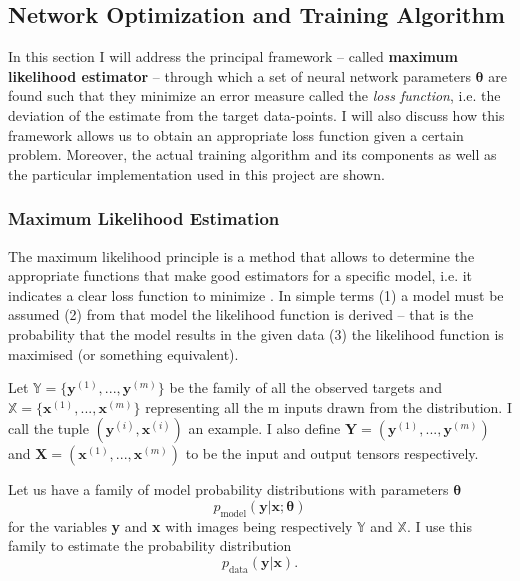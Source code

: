 \subsection{Network Optimization and Training Algorithm} \label{sec:networkoptim}
In this section I will address the principal framework -- called \textbf{maximum likelihood estimator} -- through which a set of neural network parameters $\bm{\theta}$ are found such that they minimize an error measure called the \textit{loss function}, i.e. the deviation of the estimate from the target data-points. I will also discuss how this framework allows us to obtain an appropriate loss function given a certain problem. Moreover, the actual training algorithm and its components as well as the particular implementation used in this project are shown.

\subsubsection{Maximum Likelihood Estimation}
The maximum likelihood principle is a method that allows to determine the appropriate functions that make good estimators for a specific model, i.e. it indicates a clear loss function to minimize \citep{Goodfellow2016}. In simple terms (1) a model must be assumed (2) from that model the likelihood function is derived -- that is the probability that the model results in the given data (3) the likelihood function is maximised (or something equivalent).

Let $\mathbb{Y} = \{\bm{y}^{(1)}, ... , \bm{y}^{(m)}\}$ be the family of all the observed targets and $\mathbb{X} = \{\bm{x}^{(1)}, ... , \bm{x}^{(m)}\}$ representing all the m inputs drawn from the distribution. I call the tuple $(\bm{y}^{(i)}, \bm{x}^{(i)})$ an example. I also define $\bm{Y} = (\bm{y}^{(1)}, ... , \bm{y}^{(m)})$ and $\bm{X} = (\bm{x}^{(1)}, ... , \bm{x}^{(m)})$ to be the input and output tensors respectively.

Let us have a family of model probability distributions with parameters $\bm{\theta}$
\begin{equation}
    p_{\text{model}}(\textbf{y}|\textbf{x}; \bm{\theta})
\end{equation}
for the variables \textbf{y} and \textbf{x} with images being respectively $\mathbb{Y}$ and $\mathbb{X}$. I use this family to estimate the probability distribution
\begin{equation}
    p_{\text{data}}(\textbf{y}|\textbf{x}).
\end{equation}


